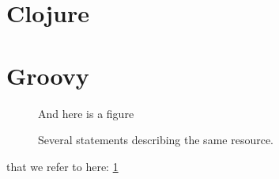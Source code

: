 \documentclass[a4paper,12pt]{kth-mag}
\begin{document}
\section{Clojure}

\section{Groovy}

\begin{figure}[ht]
\begin{center}
And here is a figure
\caption{\small{Several statements describing the same resource.}}\label{RDF_4}
\end{center}
\end{figure}

that we refer to here: \ref{RDF_4}

\newpage
\renewcommand{\refname}{\section{References}}



\end{document}
